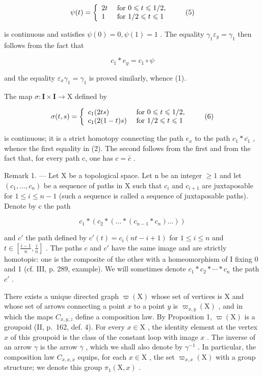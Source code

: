 \[
\psi (t) = \left\{ \begin{array}{l l} 2 t & \text { for } 0 \leqslant t \leqslant 1 / 2, \\ 1 & \text { for } 1 / 2 \leqslant t \leqslant 1 \end{array} \right.\tag{5}
\]

is continuous and satisfies \(\psi(0)=0,\psi(1)=1\) . The equality \(\gamma_{1}\varepsilon_{y}=\gamma_{1}\) then follows from the fact that

\[
c _ {1} * e _ {y} = c _ {1} \circ \psi
\]

and the equality \(\varepsilon_{x}\gamma_{1}=\gamma_{1}\) is proved similarly, whence (1).

The map \(\sigma\colon\mathbf{I}\times\mathbf{I}\to\mathrm{X}\) defined by

\[
\sigma (t, s) = \left\{ \begin{array}{l l} c _ {1} (2 t s) & \text { for } 0 \leqslant t \leqslant 1 / 2, \\ c _ {1} (2 (1 - t) s) & \text { for } 1 / 2 \leqslant t \leqslant 1 \end{array} \right.\tag{6}
\]

is continuous; it is a strict homotopy connecting the path \(e_{x}\) to the path \(c_{1}*\overline{c_{1}}\) , whence the first equality in (2). The second follows from the first and from the fact that, for every path c, one has \(c=\overline{\overline{c}}\) .

Remark 1. --- Let X be a topological space. Let n be an integer \(\geqslant 1\) and let \((c_{1},\ldots,c_{n})\) be a sequence of paths in X such that \(c_{i}\) and \(c_{i+1}\) are juxtaposable for \(1 \leqslant i \leqslant n-1\) (such a sequence is called a sequence of juxtaposable paths). Denote by c the path

\[
c _ {1} * \left(c _ {2} * \left(\dots * \left(c _ {n - 1} * c _ {n}\right) \ldots\right)\right)
\]

and \(c'\) the path defined by \(c'(t) = c_i(nt - i + 1)\) for \(1 \leqslant i \leqslant n\) and \(t \in [\frac{i-1}{n}, \frac{i}{n}]\) . The paths \(c\) and \(c'\) have the same image and are strictly homotopic: one is the composite of the other with a homeomorphism of I fixing 0 and 1 (cf. III, p. 289, example). We will sometimes denote \(c_{1} * c_{2} * \cdots * c_{n}\) the path \(c'\) .

There exists a unique directed graph \(\varpi(\mathrm{X})\) whose set of vertices is X and whose set of arrows connecting a point \(x\) to a point \(y\) is \(\varpi_{x,y}(\mathrm{X})\) , and in which the maps \(C_{x,y,z}\) define a composition law. By Proposition 1, \(\varpi(\mathrm{X})\) is a groupoid (II, p.~162, def. 4). For every \(x \in \mathrm{X}\) , the identity element at the vertex \(x\) of this groupoid is the class of the constant loop with image \(x\) . The inverse of an arrow \(\gamma\) is the arrow \(\overline{\gamma}\) , which we shall also denote by \(\gamma^{-1}\) . In particular, the composition law \(C_{x,x,x}\) equips, for each \(x \in \mathrm{X}\) , the set \(\varpi_{x,x}(\mathrm{X})\) with a group structure; we denote this group \(\pi_1(\mathrm{X}, x)\) .

